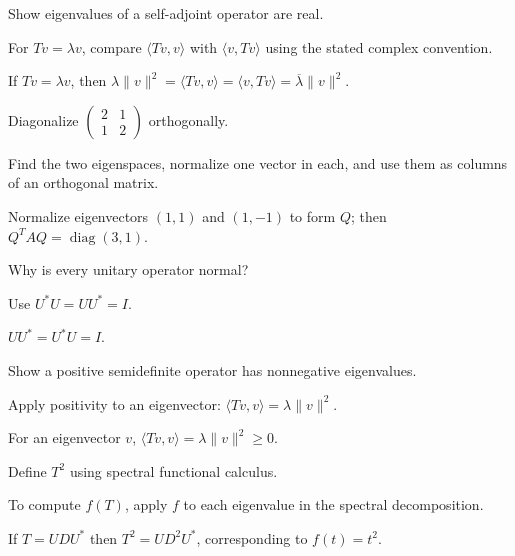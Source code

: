 \begin{exercise}\label{exr:i16-01}
Show eigenvalues of a self-adjoint operator are real.
\end{exercise}
\begin{hint}
For \(Tv=\lambda v\), compare \(\langle Tv,v\rangle\) with \(\langle v,Tv\rangle\) using the stated complex convention.
\end{hint}
\begin{solution}
If $Tv=\lambda v$, then $\lambda\|v\|^2=\langle Tv,v\rangle=\langle v,Tv\rangle=\overline\lambda\|v\|^2$.
\end{solution}

\begin{exercise}\label{exr:i16-02}
Diagonalize $\begin{pmatrix}2&1\\1&2\end{pmatrix}$ orthogonally.
\end{exercise}
\begin{hint}
Find the two eigenspaces, normalize one vector in each, and use them as columns of an orthogonal matrix.
\end{hint}
\begin{solution}
Normalize eigenvectors $(1,1)$ and $(1,-1)$ to form $Q$; then $Q^TAQ=\operatorname{diag}(3,1)$.
\end{solution}

\begin{exercise}\label{exr:i16-03}
Why is every unitary operator normal?
\end{exercise}
\begin{hint}
Use \(U^*U=UU^*=I\).
\end{hint}
\begin{solution}
$UU^*=U^*U=I$.
\end{solution}

\begin{exercise}\label{exr:i16-04}
Show a positive semidefinite operator has nonnegative eigenvalues.
\end{exercise}
\begin{hint}
Apply positivity to an eigenvector: \(\langle Tv,v\rangle=\lambda\|v\|^2\).
\end{hint}
\begin{solution}
For an eigenvector $v$, $\langle Tv,v\rangle=\lambda\|v\|^2\ge0$.
\end{solution}

\begin{exercise}\label{exr:i16-05}
Define $T^2$ using spectral functional calculus.
\end{exercise}
\begin{hint}
To compute \(f(T)\), apply \(f\) to each eigenvalue in the spectral decomposition.
\end{hint}
\begin{solution}
If $T=UDU^*$ then $T^2=UD^2U^*$, corresponding to $f(t)=t^2$.
\end{solution}

